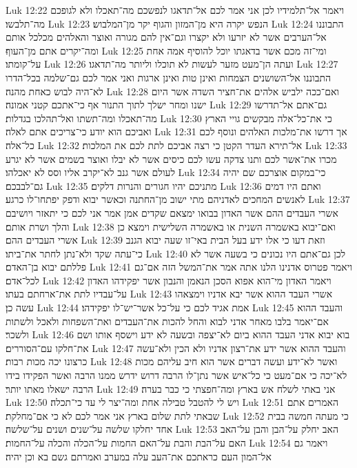 Luk 12:22  ויאמר אל־תלמידיו לכן אני אמר לכם אל־תדאגו לנפשכם מה־תאכלו ולא לגופכם מה־תלבשו׃
Luk 12:23  הנפש יקרה היא מן־המזון והגוף יקר מן־המלבוש׃
Luk 12:24  התבוננו אל־הערבים אשר לא יזרעו ולא יקצרו וגם־אין להם מגורה ואוצר והאלהים מכלכל אותם ומה־יקרים אתם מן־העוף׃
Luk 12:25  ומי־זה מכם אשר בדאגתו יוכל להוסיף אמה אחת על־קומתו׃
Luk 12:26  ועתה הן־מעט מזער לעשות לא תוכלו וליותר מה־תדאגו׃
Luk 12:27  התבוננו אל־השושנים הצמחות ואינן טות ואינן ארגות ואני אמר לכם גם־שלמה בכל־הדרו לא־היה לבוש כאחת מהנה׃
Luk 12:28  ואם־ככה ילביש אלהים את־חציר השדה אשר היום ישנו ומחר ישלך לתוך התנור אף כי־אתכם קטני אמונה׃
Luk 12:29  גם־אתם אל־תדרשו מה־תאכלו ומה־תשתו ואל־תהלכו בגדלות׃
Luk 12:30  כי את־כל־אלה מבקשים גויי הארץ ואביכם הוא יודע כי־צריכים אתם לאלה׃
Luk 12:31  אך דרשו את־מלכות האלהים ונוסף לכם כל־אלה׃
Luk 12:32  אל־תירא העדר הקטן כי רצה אביכם לתת לכם את המלכות׃
Luk 12:33  מכרו את־אשר לכם ותנו צדקה עשו לכם כיסים אשר לא יבלו ואוצר בשמים אשר לא יגרע לעולם אשר גנב לא־יקרב אליו וסס לא יאכלהו׃
Luk 12:34  כי־במקום אוצרכם שם יהיה גם־לבבכם׃
Luk 12:35  מתניכם יהיו חגורים והנרות דלקים׃
Luk 12:36  ואתם היו דמים לאנשים המחכים לאדניהם מתי ישוב מן־החתנה וכאשר יבוא ודפק יפתחו־לו כרגע׃
Luk 12:37  אשרי העבדים ההם אשר האדון בבואו ימצאם שקדים אמן אמר אני לכם כי יתאזר ויושיבם והלך ושרת אותם׃
Luk 12:38  ואם־יבוא באשמרה השנית או באשמרה השלישית וימצא כן אשרי העבדים ההם׃
Luk 12:39  וזאת דעו כי אלו ידע בעל הבית באי־זו שעה יבוא הגנב כי־עתה שקד ולא־נתן לחתר את־ביתו׃
Luk 12:40  לכן גם־אתם היו נכונים כי בשעה אשר לא פללתם יבוא בן־האדם׃
Luk 12:41  ויאמר פטרוס אדנינו הלנו אתה אמר את־המשל הזה אם־גם לכל־אדם׃
Luk 12:42  ויאמר האדון מי־הוא אפוא הסכן הנאמן והנבון אשר יפקידהו האדון על־עבדיו לתת את־ארחתם בעתו׃
Luk 12:43  אשרי העבד ההוא אשר יבא אדניו וימצאהו עשה כן׃
Luk 12:44  אמת אגיד לכם כי על־כל אשר־יש־לו יפקידהו׃
Luk 12:45  והעבד ההוא אם־יאמר בלבו מאחר אדני לבוא והחל להכות את־העבדים ואת־השפחות ולאכל ולשתות ולשכר׃
Luk 12:46  בוא יבוא אדני העבד ההוא ביום לא־יצפה ובשעה לא ידע וישסף אותו ושם את־חלקו עם־הסוררים׃
Luk 12:47  והעבד ההוא אשר ידע את־רצון אדניו ולא הכין ולא־עשה כרצונו יכה מכות רבות׃
Luk 12:48  ואשר לא־ידע ועשה דברים אשר הוא חיב עליהם מכות לא־יכה כי אם־מעט כי כל־איש אשר נתן־לו הרבה דרוש ידרש ממנו הרבה ואשר הפקידו בידו הרבה ישאלו מאתו יותר׃
Luk 12:49  אני באתי לשלח אש בארץ ומה־חפצתי כי כבר בערה׃
Luk 12:50  ויש לי להטבל טבילה אחת ומה־יצר לי עד כי־תכלה׃
Luk 12:51  האמרים אתם שבאתי לתת שלום בארץ אני אמר לכם לא כי אם־מחלקת׃
Luk 12:52  כי מעתה חמשה בבית אחד יחלקו שלשה על־שנים ושנים על־שלשה׃
Luk 12:53  האב יחלק על־הבן והבן על־האב האם על־הבת והבת על־האם החמות על־הכלה והכלה על־החמות׃
Luk 12:54  ויאמר גם אל־המון העם כראתכם את־העב עלה במערב ואמרתם גשם בא וכן יהיה׃
